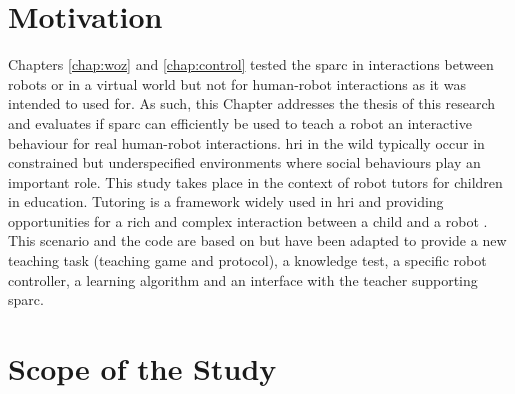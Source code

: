 \section{Motivation}

Chapters \ref{chap:woz} and \ref{chap:control} tested the \gls{sparc} in interactions between robots or in a virtual world but not for human-robot interactions as it was intended to used for. As such, this Chapter addresses the thesis of this research and evaluates if \gls{sparc} can efficiently be used to teach a robot an interactive behaviour for real human-robot interactions. \gls{hri} in the wild typically occur in constrained but underspecified environments where social behaviours play an important role.  This study takes place in the context of robot tutors for children in education. Tutoring is a framework widely used in \gls{hri} and providing opportunities for a rich and complex interaction between a child and a robot \citep{leyzberg2012physical,kennedy2015robot}. This scenario and the code are based on \cite{lemaignan2017free} but have been adapted to provide a new teaching task (teaching game and protocol), a knowledge test, a specific robot controller, a learning algorithm and an interface with the teacher supporting \gls{sparc}.


\section{Scope of the Study} \label{sec:tutoring_scope}

